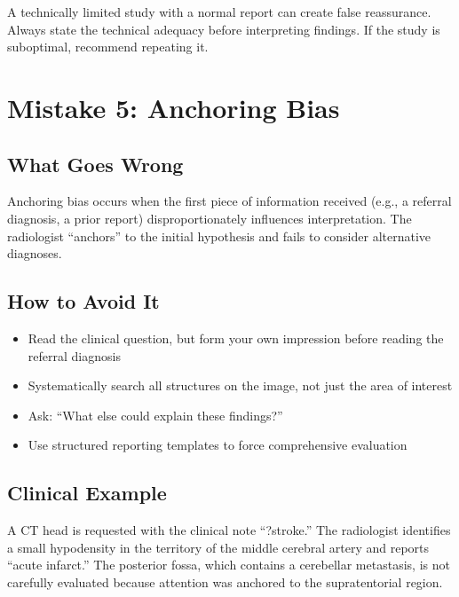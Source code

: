 \begin{pearlbox}
A technically limited study with a normal report can create false reassurance. Always state the technical adequacy before interpreting findings. If the study is suboptimal, recommend repeating it.
\end{pearlbox}

\clearpage

\section{Mistake 5: Anchoring Bias}

\subsection{What Goes Wrong}
Anchoring bias occurs when the first piece of information received (e.g., a referral diagnosis, a prior report) disproportionately influences interpretation. The radiologist ``anchors'' to the initial hypothesis and fails to consider alternative diagnoses.

\subsection{How to Avoid It}
\begin{itemize}
    \item Read the clinical question, but form your own impression before reading the referral diagnosis
    \item Systematically search all structures on the image, not just the area of interest
    \item Ask: ``What else could explain these findings?''
    \item Use structured reporting templates to force comprehensive evaluation
\end{itemize}

\subsection{Clinical Example}
A CT head is requested with the clinical note ``?stroke.'' The radiologist identifies a small hypodensity in the territory of the middle cerebral artery and reports ``acute infarct.'' The posterior fossa, which contains a cerebellar metastasis, is not carefully evaluated because attention was anchored to the supratentorial region.

